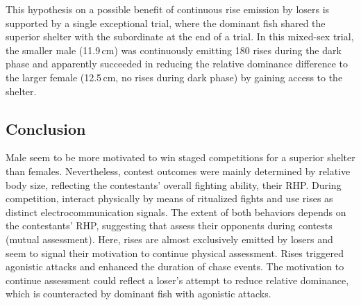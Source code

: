 This hypothesis on a possible benefit of continuous rise emission by losers is supported by a single exceptional trial, where the dominant fish shared the superior shelter with the subordinate at the end of a trial. In this mixed-sex trial, the smaller male (11.9\,cm) was
continuously emitting 180 rises during the dark phase and apparently succeeded in reducing the relative dominance difference to the larger female (12.5\,cm, no rises during dark
phase) by gaining access to the shelter.


\subsection{Conclusion}

Male \lepto{} seem to be more motivated to win staged competitions for a superior shelter than females. Nevertheless, contest outcomes were mainly determined by relative body size, reflecting the contestants' overall fighting ability, their RHP. During competition, \lepto{} interact physically by means of ritualized fights and use rises as distinct electrocommunication signals. The extent of both behaviors depends on the contestants'
RHP, suggesting that \lepto{} assess their opponents during contests (mutual assessment). Here, rises are almost exclusively emitted by losers and seem to signal their motivation to continue physical assessment. Rises triggered agonistic attacks and enhanced
the duration of chase events. The motivation to continue assessment could reflect a loser's attempt to reduce relative dominance, which is counteracted by dominant fish with agonistic attacks.


%
%

